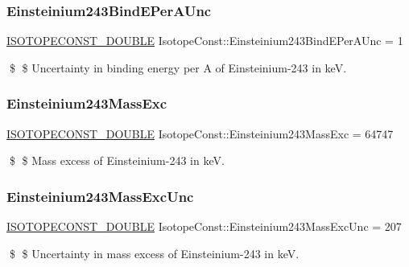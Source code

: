 \subsubsection{\texorpdfstring{Einsteinium243\+Bind\+E\+Per\+A\+Unc}{Einsteinium243BindEPerAUnc}}
{\footnotesize\ttfamily \mbox{\hyperlink{group___isotope_const-_macros_ga8f45a7272ce02c0b4c65c44636ed719a}{I\+S\+O\+T\+O\+P\+E\+C\+O\+N\+S\+T\+\_\+\+D\+O\+U\+B\+LE}} Isotope\+Const\+::\+Einsteinium243\+Bind\+E\+Per\+A\+Unc = 1}

\$ \$ Uncertainty in binding energy per A of Einsteinium-\/243 in keV. \mbox{\label{group___isotope_const-_einsteinium-_es243_ga3bdde88a80a10c74c03ece35cea1f60d}} 
\subsubsection{\texorpdfstring{Einsteinium243\+Mass\+Exc}{Einsteinium243MassExc}}
{\footnotesize\ttfamily \mbox{\hyperlink{group___isotope_const-_macros_ga8f45a7272ce02c0b4c65c44636ed719a}{I\+S\+O\+T\+O\+P\+E\+C\+O\+N\+S\+T\+\_\+\+D\+O\+U\+B\+LE}} Isotope\+Const\+::\+Einsteinium243\+Mass\+Exc = 64747}

\$ \$ Mass excess of Einsteinium-\/243 in keV. \mbox{\label{group___isotope_const-_einsteinium-_es243_ga992fa2fa0d9b4469f7e34db64f14ee27}} 
\subsubsection{\texorpdfstring{Einsteinium243\+Mass\+Exc\+Unc}{Einsteinium243MassExcUnc}}
{\footnotesize\ttfamily \mbox{\hyperlink{group___isotope_const-_macros_ga8f45a7272ce02c0b4c65c44636ed719a}{I\+S\+O\+T\+O\+P\+E\+C\+O\+N\+S\+T\+\_\+\+D\+O\+U\+B\+LE}} Isotope\+Const\+::\+Einsteinium243\+Mass\+Exc\+Unc = 207}

\$ \$ Uncertainty in mass excess of Einsteinium-\/243 in keV. \mbox{\label{group___isotope_const-_einsteinium-_es243_ga02d0a0ef51747c12ccb78f40af96ee0c}} 
